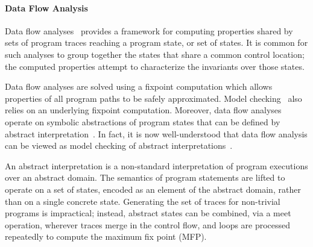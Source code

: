 \paragraph{Data Flow Analysis}
Data flow analyses~\cite{kildall1973unified} 
provides a framework for computing properties shared by sets of
program traces reaching a program state, or set of states.  It is
common for such analyses to group together the states that share a
common control location; the computed properties attempt to characterize
the invariants over those states.

Data flow analyses are solved using a fixpoint computation which
allows properties of all program paths to be safely approximated.
Model checking~\cite{clarke1999model} also relies on an underlying
fixpoint computation.  Moreover, data flow
analyses operate on symbolic abstractions of program states that
can be defined by abstract interpretation~\cite{cousot1977abstract}. 
In fact, it is now well-understood that data flow analysis can be
viewed as model checking of abstract interpretations~\cite{schmidt1998data}.

An abstract interpretation is a 
non-standard interpretation of program executions over an abstract domain.  
The semantics of program statements are lifted to operate
on a set of states, encoded as an element of the abstract domain,
rather than on a single concrete state.  
Generating the set of traces for non-trivial programs is impractical;
instead, abstract states can be combined, via a meet operation, wherever
traces merge in the control flow, and loops are processed
repeatedly to compute the maximum fix point (MFP).

